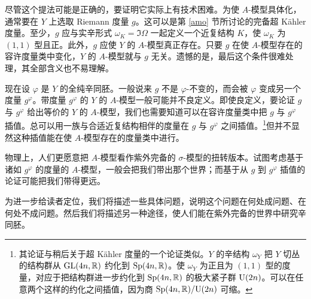 尽管这个提法可能是正确的，要证明它实际上有技术困难。为使 $A$-模型具体化，通常要在 $Y$ 上选取 Riemann 度量 $g$。这可以是第 \ref{amo} 节所讨论的完备超 Kähler 度量。至少，$g$ 应与实辛形式 $\omega_K=\Im\Omega$ 一起定义一个近复结构 $K$，使 $\omega_K$ 为 $(1,1)$ 型且正。此外，$g$ 应使 $Y$ 的 $A$-模型真正存在。只要 $g$ 在使 $A$-模型存在的容许度量类中变化，$Y$ 的 $A$-模型就与 $g$ 无关。遗憾的是，最后这个条件很难处理，其全部含义也不易理解。

现在设 $\varphi$ 是 $Y$ 的全纯辛同胚。一般说来 $g$ 不是 $\varphi$-不变的，而会被 $\varphi$ 变成另一个度量 $g^\varphi$。带度量 $g^\varphi$ 的 $Y$ 的 $A$-模型一般可能并不良定义。即使良定义，要论证 $g$ 与 $g^\varphi$ 给出等价的 $Y$ 的 $A$-模型，我们也需要知道可以在容许度量类中把 $g$ 与 $g^\varphi$ 插值。总可以用一族与合适近复结构相伴的度量在 $g$ 与 $g^\varphi$ 之间插值。\footnote{其论证与稍后关于超 Kähler 度量的一个论证类似。$Y$ 的辛结构 $\omega_Y$ 把 $Y$ 切丛的结构群从 ${\mathrm{GL}}(4n,{\mathbb R})$ 约化到 ${\mathrm{Sp}}(4n,{\mathbb R})$。使 $\omega_Y$ 为正且为 $(1,1)$ 型的度量，对应于把结构群进一步约化到 ${\mathrm{Sp}}(4n,{\mathbb R})$ 的极大紧子群 ${\mathrm U}(2n)$。可以在任意两个这样的约化之间插值，因为商 ${\mathrm{Sp}}(4n,{\mathbb R})/{\mathrm U}(2n)$ 可缩。}但并不显然这种插值能在使 $A$-模型存在的度量类中进行。

物理上，人们更愿意把 $A$-模型看作紫外完备的 $\sigma$-模型的扭转版本。试图考虑基于诸如 $g^\varphi$ 的度量的 $A$-模型，一般会把我们带出那个世界；而基于从 $g$ 到 $g^\varphi$ 插值的论证可能把我们带得更远。

为进一步给读者定位，我们将描述一些具体问题，说明这个问题在何处成问题、在何处不成问题。然后我们将描述另一种途径，使人们能在紫外完备的世界中研究辛同胚。

